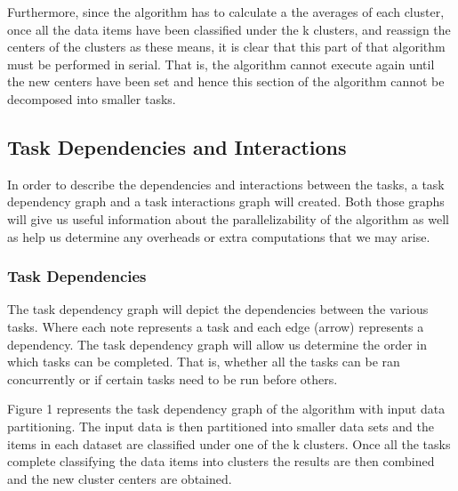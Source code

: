 \documentclass[12pt]{article}
\begin{document}
    		\begin{flushleft}
    			Furthermore, since the algorithm has to calculate a the averages of each cluster, once all the data items have been classified under the k clusters, and reassign the centers of the clusters as these means, it is clear that this part of that algorithm must be performed in serial. That is, the algorithm cannot execute again until the new centers have been set and hence this section of the algorithm cannot be decomposed into smaller tasks.
    		\end{flushleft}
    	
    	\subsection{Task Dependencies and Interactions}
    		\begin{flushleft}
    			In order to describe the dependencies and interactions between the tasks, a task dependency graph and a task interactions graph will created. Both those graphs will give us useful information about the parallelizability of the algorithm as well as help us determine any overheads or extra computations that we may arise.
    		\end{flushleft}
    		
    		\subsubsection{Task Dependencies}
    			\begin{flushleft}
    				The task dependency graph will depict the dependencies between the various tasks. Where each note represents a task and each edge (arrow) represents a dependency. The task dependency graph will allow us determine the order in which tasks can be completed. That is, whether all the tasks can be ran concurrently or if certain tasks need to be run before others.
    			\end{flushleft}
    			
    			\begin{flushleft}
    				Figure 1 represents the task dependency graph of the algorithm with input data partitioning. The input data is then partitioned into smaller data sets and the items in each dataset are classified under one of the k clusters. Once all the tasks complete classifying the data items into clusters the results are then combined and the new cluster centers are obtained.
    			\end{flushleft}
    			
\end{document}
